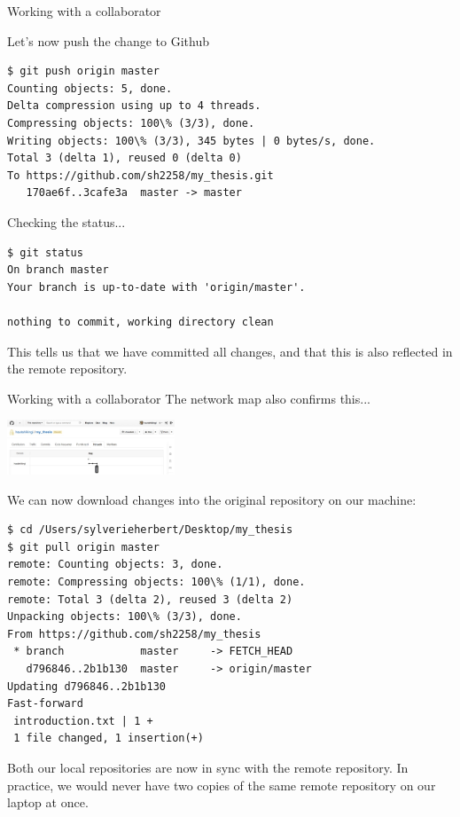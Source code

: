 \documentclass[10pt]{beamer}
\begin{document}
\begin{frame}[fragile]{Working with a collaborator}

Let's now push the change to Github
\begin{lstlisting}
$ git push origin master
Counting objects: 5, done.
Delta compression using up to 4 threads.
Compressing objects: 100\% (3/3), done.
Writing objects: 100\% (3/3), 345 bytes | 0 bytes/s, done.
Total 3 (delta 1), reused 0 (delta 0)
To https://github.com/sh2258/my_thesis.git
   170ae6f..3cafe3a  master -> master
\end{lstlisting}
Checking the status...
\begin{lstlisting}
$ git status
On branch master
Your branch is up-to-date with 'origin/master'.

nothing to commit, working directory clean
\end{lstlisting}
This tells us that we have committed all changes, and that this is also reflected in the remote repository.


\end{frame}

\begin{frame}[fragile]{Working with a collaborator}
The network map also confirms this...
\begin{center}
\includegraphics[width=5cm]{./auxfiles/Network_update.jpg}
\end{center}
We can now download changes into the original repository on our machine:
\begin{lstlisting}
$ cd /Users/sylverieherbert/Desktop/my_thesis
$ git pull origin master
remote: Counting objects: 3, done.
remote: Compressing objects: 100\% (1/1), done.
remote: Total 3 (delta 2), reused 3 (delta 2)
Unpacking objects: 100\% (3/3), done.
From https://github.com/sh2258/my_thesis
 * branch            master     -> FETCH_HEAD
   d796846..2b1b130  master     -> origin/master
Updating d796846..2b1b130
Fast-forward
 introduction.txt | 1 +
 1 file changed, 1 insertion(+)
\end{lstlisting}
Both our local repositories are now in sync with the remote repository. In practice, we would never have two copies of the same remote repository on our laptop at once.
\end{frame}
\end{document}
